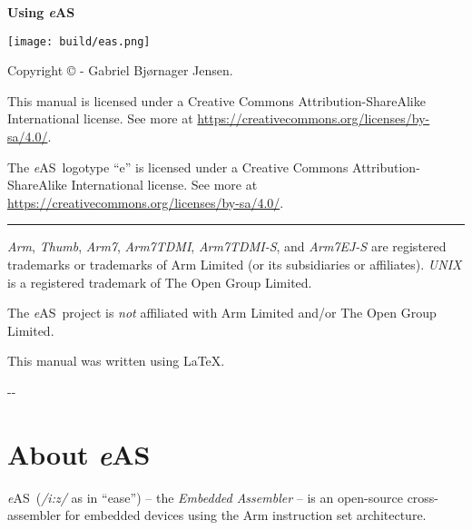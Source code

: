 \documentclass[a4paper]{article}
\title{\documenttitle}
\author{Gabriel Bjørnager Jensen}
\date{\documentdate}
\newcommand*{\eAS}{\textup{\textit{e}AS}}
\newcommand*{\easversion}{\oldstylenums{0.3.0}}
\newcommand*{\documenttitle}{Using \eAS}
\newcommand*{\documentdate}{\oldstylenums{2024}-\oldstylenums{02}-\oldstylenums{04}}
\newcommand*{\rulewidth}{0.4pt}
\begin{document}
	\thispagestyle{empty} %

	\vspace*{\fill}
	\begin{center}
		{\huge\bfseries\documenttitle}

		\texttt{[image: build/eas.png]} %

		{\huge\bfseries\easversion}
	\end{center}
	\vspace*{\fill}

	\clearpage
	\thispagestyle{empty} %
	\begin{center}
		Copyright © - Gabriel Bjørnager Jensen.

		This manual is licensed under a Creative Commons Attribution-ShareAlike  International license.
		See more at \url{https://creativecommons.org/licenses/by-sa/4.0/}.

		The \eAS\ logotype ``e'' is licensed under a Creative Commons Attribution-ShareAlike  International license.
		See more at \url{https://creativecommons.org/licenses/by-sa/4.0/}.

		\rule{\linewidth}{\rulewidth}

		\textit{Arm}, \textit{Thumb}, \textit{Arm7}, \textit{Arm7TDMI}, \textit{Arm7TDMI-S}, and \textit{Arm7EJ-S} are registered trademarks or trademarks of Arm Limited (or its subsidiaries or affiliates).
		\textit{UNIX} is a registered trademark of The Open Group Limited.

		The \eAS\ project is \textit{not} affiliated with Arm Limited and/or The Open Group Limited.

		\vspace*{\fill}

		This manual was written using \LaTeX.

		\documentdate
	\end{center}

	\clearpage
	\tableofcontents

	\clearpage
	\section{About \eAS}
		\label{sec:about_eas}
		\eAS\ (\textit{/i:z/} as in ``ease'') -- the \textit{Embedded Assembler} -- is an open-source cross-assembler for embedded devices using the Arm instruction set architecture.
\end{document}
